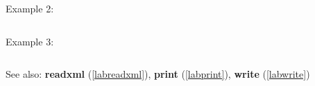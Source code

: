 \noindent Example 2: 
\begin{center}\begin{minipage}{15cm}\begin{Verbatim}[frame=single]
\end{Verbatim}
\end{minipage}\end{center}
\noindent Example 3: 
\begin{center}\begin{minipage}{15cm}\begin{Verbatim}[frame=single]
\end{Verbatim}
\end{minipage}\end{center}
See also: \textbf{readxml} (\ref{labreadxml}), \textbf{print} (\ref{labprint}), \textbf{write} (\ref{labwrite})
